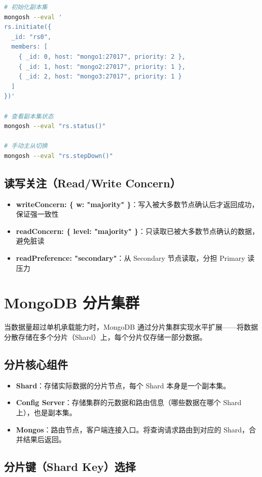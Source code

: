 \documentclass[12pt,UTF8]{ctexbook}
\begin{document}
\begin{lstlisting}[language=bash]
# 初始化副本集
mongosh --eval '
rs.initiate({
  _id: "rs0",
  members: [
    { _id: 0, host: "mongo1:27017", priority: 2 },
    { _id: 1, host: "mongo2:27017", priority: 1 },
    { _id: 2, host: "mongo3:27017", priority: 1 }
  ]
})'

# 查看副本集状态
mongosh --eval "rs.status()"

# 手动主从切换
mongosh --eval "rs.stepDown()"
\end{lstlisting}

\subsection*{读写关注（Read/Write Concern）}

\begin{itemize}
    \item \textbf{writeConcern: \{ w: "majority" \}}：写入被大多数节点确认后才返回成功，保证强一致性
    \item \textbf{readConcern: \{ level: "majority" \}}：只读取已被大多数节点确认的数据，避免脏读
    \item \textbf{readPreference: "secondary"}：从 Secondary 节点读取，分担 Primary 读压力
\end{itemize}

\section{MongoDB 分片集群}
\label{sec:mongodb-shard}

当数据量超过单机承载能力时，MongoDB 通过分片集群实现水平扩展——将数据分散存储在多个分片（Shard）上，每个分片仅存储一部分数据。

\subsection*{分片核心组件}

\begin{itemize}
    \item \textbf{Shard}：存储实际数据的分片节点，每个 Shard 本身是一个副本集。
    \item \textbf{Config Server}：存储集群的元数据和路由信息（哪些数据在哪个 Shard 上），也是副本集。
    \item \textbf{Mongos}：路由节点，客户端连接入口。将查询请求路由到对应的 Shard，合并结果后返回。
\end{itemize}

\subsection*{分片键（Shard Key）选择}
\end{document}
